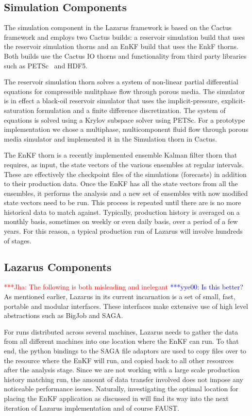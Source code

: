 \documentclass[conference,final]{IEEEtran}
\newcommand{\jhanote}[1]{ {\textcolor{red} { ***Jha: #1 }}}
\newcommand{\yyenote}[1]{ {\textcolor{blue} { ***yye00: #1 }}}
\newcommand{\jhanote}[1]{}
\newcommand{\yyenote}[1]{}
\begin{document}
\subsection{Simulation Components}
The simulation component in the Lazarus framework is based on the
Cactus framework and employs two Cactus builds: a reservoir simulation
build that uses the reservoir simulation thorns and an EnKF build that
uses the EnkF thorns. Both builds use the Cactus IO thorns and
functionality from third party libraries such as PETSc~\cite{PETSc}
and HDF5.

The reservoir simulation thorn solves a system of non-linear partial
differential equations for compressible mulitphase flow through porous
media. The simulator is in effect a black-oil reservoir simulator that
uses the implicit-pressure, explicit-saturation formulation and a
finite difference discretization. The system of equations is solved
using a Krylov subspace solver using PETSc. For a prototype
implementation we chose a multiphase, multicomponent fluid flow
through porous media simulator and implemented it in the Simulation
thorn in Cactus.

The EnKF thorn is a recently implemented ensemble Kalman filter
thorn that requires, as input, the state vectors of the various
ensembles at regular intervals. These are effectively the checkpoint
files of the simulations (forecasts) in addition to their production
data. Once the EnKF has all the state vectors from all the ensembles, 
it performs the analysis and a new set of ensembles with now modified
state vectors need to be run. This process is repeated until there
are is no more historical data to match against. Typically,
production history is averaged on a monthly basis, sometimes on weekly
or even daily basis, over a period of a few years. For this reason,
a typical production run of Lazarus will involve hundreds of stages.

\subsection{Lazarus Components}

\jhanote{The following is both misleading and inelegant} \yyenote{Is this better?}
As mentioned
earlier, Lazarus in its current incarnation is a set of small, fast,
portable and modular interfaces. These interfaces make extensive use
of high level abstractions such as BigJob and SAGA.

For runs distributed across several machines, Lazarus needs to gather
the data from all different machines into one location where the EnKF
can run. To that end, the python bindings to the SAGA file adaptors
are used to copy files over to the resource where the EnKF will run,
and copied back to all other resources after the analysis stage. Since
we are not working with a large scale production history matching run,
the amount of data transfer involved does not impose any noticeable
performance issues. Naturally, investigating the optimal location for
placing the EnKF application as discussed in \cite{escience07} will
find its way into the next iteration of Lazarus implementation and of
course FAUST.
\end{document}
